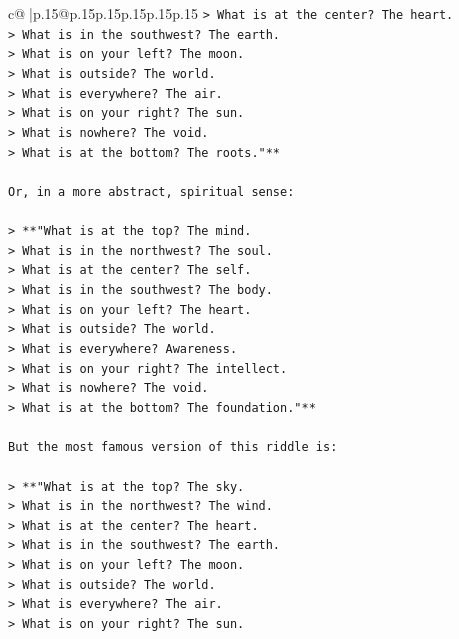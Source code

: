 \documentclass{article}
\begin{document}
{\begin{supertabular}{c@{$\;$}|p{.15\linewidth}@{}p{.15\linewidth}p{.15\linewidth}p{.15\linewidth}p{.15\linewidth}p{.15\linewidth}}
{{{\texttt{> What is at the center? The heart.  } \\
\texttt{> What is in the southwest? The earth.  } \\
\texttt{> What is on your left? The moon.  } \\
\texttt{> What is outside? The world.  } \\
\texttt{> What is everywhere? The air.  } \\
\texttt{> What is on your right? The sun.  } \\
\texttt{> What is nowhere? The void.  } \\
\texttt{> What is at the bottom? The roots."**} \\
\\ 
\texttt{Or, in a more abstract, spiritual sense:} \\
\\ 
\texttt{> **"What is at the top? The mind.  } \\
\texttt{> What is in the northwest? The soul.  } \\
\texttt{> What is at the center? The self.  } \\
\texttt{> What is in the southwest? The body.  } \\
\texttt{> What is on your left? The heart.  } \\
\texttt{> What is outside? The world.  } \\
\texttt{> What is everywhere? Awareness.  } \\
\texttt{> What is on your right? The intellect.  } \\
\texttt{> What is nowhere? The void.  } \\
\texttt{> What is at the bottom? The foundation."**} \\
\\ 
\texttt{But the most famous version of this riddle is:} \\
\\ 
\texttt{> **"What is at the top? The sky.  } \\
\texttt{> What is in the northwest? The wind.  } \\
\texttt{> What is at the center? The heart.  } \\
\texttt{> What is in the southwest? The earth.  } \\
\texttt{> What is on your left? The moon.  } \\
\texttt{> What is outside? The world.  } \\
\texttt{> What is everywhere? The air.  } \\
\texttt{> What is on your right? The sun.  } \\
}}}
\end{supertabular}}
\end{document}
